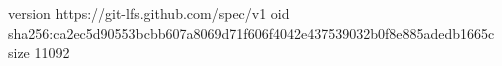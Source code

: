 version https://git-lfs.github.com/spec/v1
oid sha256:ca2ec5d90553bcbb607a8069d71f606f4042e437539032b0f8e885adedb1665c
size 11092
